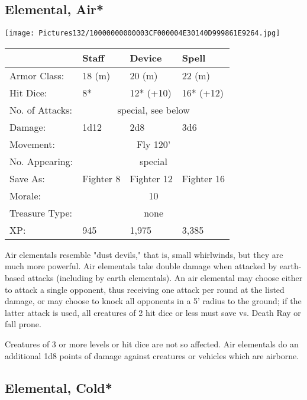 \documentclass[a4paper,twoside,openany,10pt]{book}
\begin{document}
\begin{multicols}{2}
\subsection*{Elemental, Air*}\label{elemental-air}

\begin{center}
	\texttt{[image: Pictures132/10000000000003CF000004E30140D999861E9264.jpg]}
\end{center}

\begin{tabularx}{0.48\textwidth}[]{@{}lXXX@{}}
& Staff & Device & Spell \\\hline
Armor Class: & 18 (m) & 20 (m) & 22 (m) \\\hline
Hit Dice: & 8* & 12* (+10) & 16* (+12) \\\hline
No. of Attacks: & \multicolumn{3}{c}{special, see below} \\\hline
Damage: & 1d12 & 2d8 & 3d6 \\\hline
Movement: & \multicolumn{3}{c}{Fly 120'} \\\hline
No. Appearing: &  \multicolumn{3}{c}{special} \\\hline
Save As: & Fighter 8 & Fighter 12 & Fighter 16 \\\hline
Morale: & \multicolumn{3}{c}{10} \\\hline
Treasure Type: & \multicolumn{3}{c}{none} \\\hline
XP: & 945 & 1,975 & 3,385 \\\hline
\end{tabularx}\medskip



Air elementals resemble "dust devils," that is, small whirlwinds, but they are much more powerful. Air elementals take double damage when attacked by earth-based attacks (including by earth elementals). An air elemental may choose either to attack a single opponent, thus receiving one attack per round at the listed damage, or may choose to knock all opponents in a 5' radius to the ground; if the latter attack is used, all creatures of 2 hit dice or less must save vs. Death Ray or fall prone. 

Creatures of 3 or more levels or hit dice are not so affected. Air elementals do an additional 1d8 points of damage against creatures or vehicles which are airborne.

\subsection*{Elemental, Cold*}\label{elemental-cold}


\end{multicols}
\end{document}
